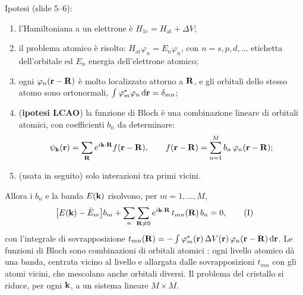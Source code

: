 \documentclass[11pt,a4paper]{article}
\begin{document}
\begin{modello}\label{mod:tb}
Ipotesi (slide 5--6):
\begin{enumerate}[leftmargin=*, label=\arabic*.]
\item l'Hamiltoniana a un elettrone è $H_{1e}=H_{\mathrm{at}}+\Delta V$;
\item il problema atomico è risolto: $H_{\mathrm{at}}\varphi_n=E_n\varphi_n$, con $n=s,p,d,\dots$ etichetta dell'orbitale ed $E_n$ energia
dell'elettrone atomico;
\item ogni $\varphi_n(\mathbf r-\mathbf R)$ è molto localizzato attorno a $\mathbf R$, e gli orbitali dello stesso atomo sono ortonormali,
$\int\varphi_m^*\varphi_n\,\mathrm d\mathbf r=\delta_{mn}$;
\item (\textbf{ipotesi LCAO}) la funzione di Bloch è una combinazione lineare di orbitali atomici, con coefficienti $b_n$ da determinare:
\[
\psi_{\mathbf k}(\mathbf r)=\sum_{\mathbf R}e^{i\mathbf k\cdot\mathbf R}f(\mathbf r-\mathbf R),\qquad f(\mathbf r-\mathbf R)=\sum_{n=1}^Mb_n\,\varphi_n(\mathbf r-\mathbf R);
\]
\item (usata in seguito) solo interazioni tra primi vicini.
\end{enumerate}
Allora i $b_n$ e la banda $E(\mathbf k)$ risolvono, per $m=1,\dots,M$,
\begin{equation*}
\bigl[E(\mathbf k)-\bar E_m\bigr]b_m+\sum_n\sum_{\mathbf R\ne0}e^{i\mathbf k\cdot\mathbf R}\,t_{mn}(\mathbf R)\,b_n=0,
\tag{I}
\end{equation*}
con l'integrale di sovrapposizione $t_{mn}(\mathbf R)=-\int\varphi_m^*(\mathbf r)\,\Delta V(\mathbf r)\,\varphi_n(\mathbf r-\mathbf R)\,\mathrm d\mathbf r$.
\tcblower
Le funzioni di Bloch sono combinazioni di orbitali atomici : ogni livello atomico dà una banda, centrata vicino al livello
e allargata dalle sovrapposizioni $t_{mn}$ con gli atomi vicini, che mescolano anche orbitali diversi. Il problema del cristallo si riduce, per ogni
$\mathbf k$, a un sistema lineare $M\times M$.
\end{modello}
\end{document}
